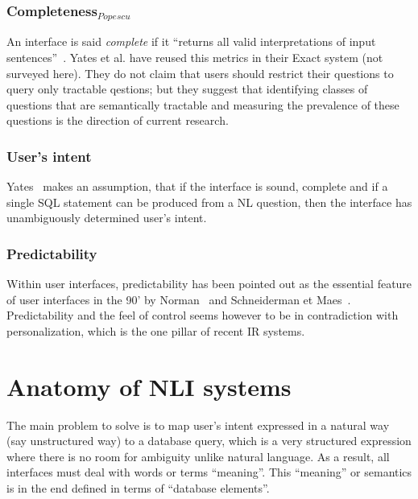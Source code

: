 \documentclass[10pt,journal,letterpaper,compsoc]{IEEEtran}
\begin{document}
\subsubsection{Completeness$_{Popescu}$}
An interface is said {\it complete} if it ``returns all valid interpretations of
input sentences''~\cite{Yates:2003:RNL:604045.604075}.
Yates et al. have reused this metrics in their {\sc Exact} system (not surveyed
here). They do not claim that users should restrict their questions to query
only tractable qestions; but they suggest that identifying classes of questions
that are semantically tractable and measuring the prevalence of these questions
is the direction of current research.


\subsubsection{User's intent}
Yates~\cite{Yates:2003:RNL:604045.604075} makes an assumption, that if the
interface is sound, complete and if a single SQL statement can be produced from
a NL question, then the interface has unambiguously determined user's intent. 

\subsubsection{Predictability}
Within user interfaces, predictability has been pointed out as the essential
feature of user interfaces in the 90' by
Norman~\cite{Norman:1994:MPI:176789.176796} and Schneiderman et
Maes~\cite{Shneiderman:1997:DMV:267505.267514}. 
Predictability and the feel of control seems however to be in contradiction with
personalization, which is the one pillar of recent IR systems. 
















\section{Anatomy of NLI systems}
\label{sec:anatomy}
The main problem to solve is to map user's intent expressed in a natural way
(say unstructured way) to a database query, which is a very structured
expression where there is no room for ambiguity unlike natural language.
As a result, all interfaces must deal with words or terms ``meaning''. This
``meaning'' or semantics is in the end defined in terms of ``database
elements''. 
\end{document}
